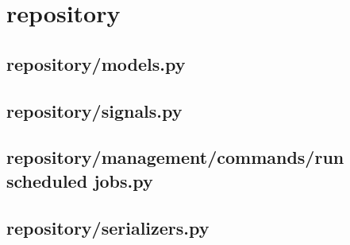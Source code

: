 %


\section{repository}



%

\subsection{repository/models.py}


\subsection{repository/signals.py}


\subsection{repository/management/commands/run scheduled jobs.py}


%

\subsection{repository/serializers.py}


